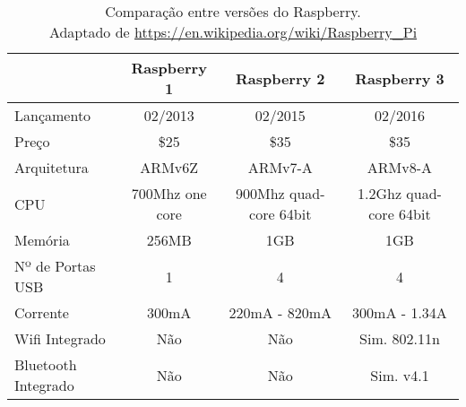 			\begin{table}[!htb]
				\centering
				\captionsetup{justification=centering}
				\caption[Comparação entre versões do Raspberry PI]{Comparação entre versões do Raspberry. \\Adaptado de \url{https://en.wikipedia.org/wiki/Raspberry_Pi}}
				\label{tbl3}
				\def\arraystretch{1.5}
				\begin{tabularx}{\textwidth}{m{2.5 cm}| m{3cm} m{3cm} p{3cm}}
					  & \multicolumn{1}{c}{\textbf{Raspberry 1}} & %
					 \multicolumn{1}{c}{\textbf{Raspberry 2}} & \multicolumn{1}{c}{\textbf{Raspberry 3}} \\ \hline
					 
					 Lançamento & \multicolumn{1}{c}{02/2013} & %
					 \multicolumn{1}{c}{02/2015} & \multicolumn{1}{c}{02/2016} \\
					 
					 Preço & \multicolumn{1}{c}{\$25} & %
					 \multicolumn{1}{c}{\$35} &
					 \multicolumn{1}{c}{\$35} \\
					 
					 Arquitetura & \multicolumn{1}{c}{ARMv6Z} & %
					 \multicolumn{1}{c}{ARMv7-A} &
					 \multicolumn{1}{c}{ARMv8-A} \\
					 
					 CPU & \multicolumn{1}{c}{700Mhz one core} & %
					 \multicolumn{1}{c}{900Mhz quad-core 64bit} &
					 \multicolumn{1}{c}{1.2Ghz quad-core 64bit} \\
					 
					 Memória & \multicolumn{1}{c}{256MB} & 
					 \multicolumn{1}{c}{1GB} &
					 \multicolumn{1}{c}{1GB} \\
					 
					 Nº de Portas USB & \multicolumn{1}{c}{1} &
					 \multicolumn{1}{c}{4} &
					 \multicolumn{1}{c}{4} \\
					 
					 Corrente & \multicolumn{1}{c}{300mA} &
					 \multicolumn{1}{c}{220mA - 820mA} &
					 \multicolumn{1}{c}{300mA - 1.34A} \\
					 
					 Wifi Integrado & \multicolumn{1}{c}{Não} & %
					 \multicolumn{1}{c}{Não} &
					 \multicolumn{1}{c}{Sim. 802.11n} \\
					 
					 Bluetooth Integrado  & \multicolumn{1}{c}{Não} & %
					 \multicolumn{1}{c}{Não} &
					 \multicolumn{1}{c}{Sim. v4.1} \\
					 
					\hline
				\end{tabularx}
			\end{table}
		

